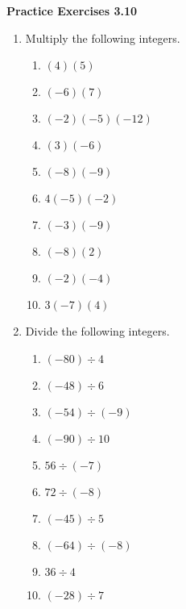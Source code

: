 \vspace{0.3ex}
\noindent\textbf{Practice Exercises 3.10}

\vspace{0.2ex}

\begin{enumerate}[noitemsep, label = \color{blue}\Alph*. ]
\item Multiply the following integers.
\begin{multicols}{2}
\begin{enumerate}[noitemsep, label = \color{blue}\arabic*. ]
\item \((4)(5)\)
\item \((-6)(7)\)
\item \((-2)(-5)(-12)\)
\item \((3)(-6)\)
\item \((-8)(-9)\)
\item \(4(-5)(-2)\)
\item \((-3)(-9)\)
\item \((-8)(2)\)
\item \((-2)(-4)\)
\item \(3(-7)(4)\)
\end{enumerate}
\end{multicols}

\item Divide the following integers.
\begin{multicols}{2}
\begin{enumerate}[noitemsep, label = \color{blue}\arabic*. ]
\item \((-80) \div 4\)
\item \((-48) \div 6\)
\item \((-54) \div (-9)\)
\item \((-90) \div 10\)
\item \(56 \div (-7)\)
\item \(72 \div (-8)\)
\item \((-45) \div 5\)
\item \((-64) \div (-8)\)
\item \(36 \div 4\)
\item \((-28) \div 7\)
\end{enumerate}
\end{multicols}

\end{enumerate}
